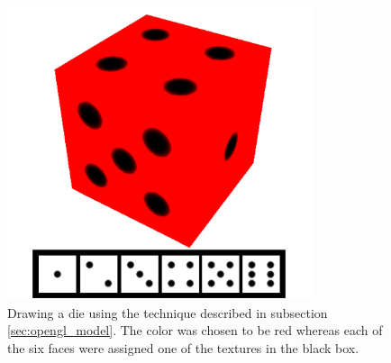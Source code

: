 \begin{figure}[h]
\begin{center}
\includegraphics[width=0.8\textwidth, trim=0cm 0cm 0cm 0cm, clip]{opengl/figures/die.png}
\end{center}
\caption{Drawing a die using the technique described in subsection \ref{sec:opengl_model}. The color was chosen to be red whereas each of the six faces were assigned one of the textures in the black box.}
\label{fig:opengl_die}
\end{figure}
